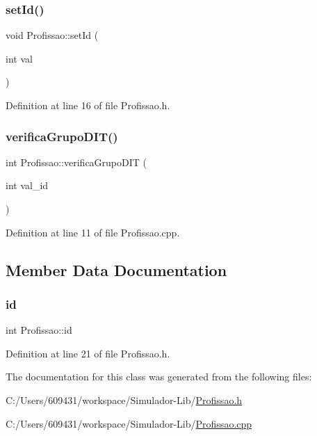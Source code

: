\subsubsection{\texorpdfstring{set\+Id()}{setId()}}
{\footnotesize\ttfamily void Profissao\+::set\+Id (\begin{DoxyParamCaption}\item[{int}]{val }\end{DoxyParamCaption})\hspace{0.3cm}{\ttfamily [inline]}}



Definition at line 16 of file Profissao.\+h.

\hypertarget{class_profissao_abaf577d0e4c656c445d4c4aa9a4bd26f}{}\label{class_profissao_abaf577d0e4c656c445d4c4aa9a4bd26f} 
\subsubsection{\texorpdfstring{verifica\+Grupo\+D\+I\+T()}{verificaGrupoDIT()}}
{\footnotesize\ttfamily int Profissao\+::verifica\+Grupo\+D\+IT (\begin{DoxyParamCaption}\item[{int}]{val\+\_\+id }\end{DoxyParamCaption})}



Definition at line 11 of file Profissao.\+cpp.



\subsection{Member Data Documentation}
\hypertarget{class_profissao_a6f9d64a9e6ca4216ca4cd1cb28d8e5dd}{}\label{class_profissao_a6f9d64a9e6ca4216ca4cd1cb28d8e5dd} 
\subsubsection{\texorpdfstring{id}{id}}
{\footnotesize\ttfamily int Profissao\+::id\hspace{0.3cm}{\ttfamily [private]}}



Definition at line 21 of file Profissao.\+h.



The documentation for this class was generated from the following files\+:\begin{DoxyCompactItemize}
\item 
C\+:/\+Users/609431/workspace/\+Simulador-\/\+Lib/\hyperlink{_profissao_8h}{Profissao.\+h}\item 
C\+:/\+Users/609431/workspace/\+Simulador-\/\+Lib/\hyperlink{_profissao_8cpp}{Profissao.\+cpp}\end{DoxyCompactItemize}
